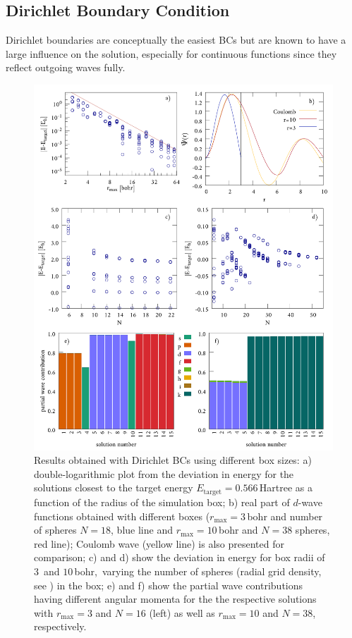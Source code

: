 \subsection{Dirichlet Boundary Condition}
\label{sec:DBCbench}
Dirichlet boundaries are conceptually the easiest BCs but are known to have a large influence on the solution, especially for continuous functions since they reflect outgoing waves fully.
\begin{figure}
\includegraphics[width=\textwidth]{Figures/BC/DirichletBC}
\caption{Results obtained with Dirichlet BCs using different box sizes:
a) double-logarithmic plot from the deviation in energy for the solutions closest to the target energy $E_\text{target}=0.566\,$Hartree as a function of the radius of the simulation box;
b) real part of $d$-wave functions obtained with different boxes ($r_\text{max}=3\,$bohr and number of spheres $N=18$, blue line and $r_\text{max}=10\,$bohr and $N=38$ spheres, red line); Coulomb wave (yellow line) is also presented for comparison;
c) and d) show the deviation in energy for box radii of $3\,$ and $10\,$bohr,\ varying the number of spheres (radial grid density, see ) in the box;
e) and f) show the partial wave contributions  having different angular momenta for the the respective solutions with $r_\text{max}=3$ and $N=16$ (left) as well as $r_\text{max}=10$ and $N=38$, respectively.}
\label{fig:dbcRad}
\end{figure}
